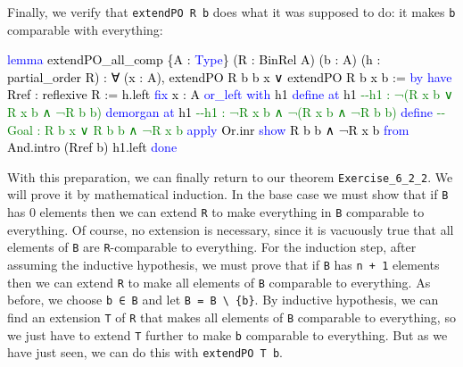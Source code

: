 \documentclass[
  letterpaper,
  DIV=11,
  numbers=noendperiod]{scrreprt}
\newenvironment{Shaded}{\begin{snugshade}}{\end{snugshade}}
\newcommand{\CommentTok}[1]{\textcolor[rgb]{0.37,0.37,0.37}{#1}}
\newcommand{\KeywordTok}[1]{\textcolor[rgb]{0.00,0.23,0.31}{#1}}
\newcommand{\NormalTok}[1]{\textcolor[rgb]{0.00,0.23,0.31}{#1}}
\renewcommand{\NormalTok}[1]{\textcolor[HTML]{000000}{#1}}
\renewcommand{\KeywordTok}[1]{\textcolor[HTML]{0000FF}{#1}}
\renewcommand{\CommentTok}[1]{\textcolor[HTML]{008000}{#1}}
\theoremstyle{remark}
\begin{document}
Finally, we verify that \texttt{extendPO\ R\ b} does what it was
supposed to do: it makes \texttt{b} comparable with everything:

\begin{Shaded}
\begin{Highlighting}[]
\KeywordTok{lemma}\NormalTok{ extendPO\_all\_comp \{A : }\KeywordTok{Type}\NormalTok{\} (R : BinRel A) (b : A)}
\NormalTok{    (h : partial\_order R) :}
\NormalTok{    ∀ (x : A), extendPO R b b x ∨ extendPO R b x b := }\KeywordTok{by}
  \KeywordTok{have}\NormalTok{ Rref : reflexive R := h.left}
  \KeywordTok{fix}\NormalTok{ x : A}
  \KeywordTok{or\_left} \KeywordTok{with}\NormalTok{ h1}
  \KeywordTok{define} \KeywordTok{at}\NormalTok{ h1     }\CommentTok{{-}{-}h1 : ¬(R x b ∨ R x b ∧ ¬R b b)}
  \KeywordTok{demorgan} \KeywordTok{at}\NormalTok{ h1   }\CommentTok{{-}{-}h1 : ¬R x b ∧ ¬(R x b ∧ ¬R b b)}
  \KeywordTok{define}           \CommentTok{{-}{-}Goal : R b x ∨ R b b ∧ ¬R x b}
  \KeywordTok{apply}\NormalTok{ Or.inr}
  \KeywordTok{show}\NormalTok{ R b b ∧ ¬R x b }\KeywordTok{from}\NormalTok{ And.intro (Rref b) h1.left}
  \KeywordTok{done}
\end{Highlighting}
\end{Shaded}

With this preparation, we can finally return to our theorem
\texttt{Exercise\_6\_2\_2}. We will prove it by mathematical induction.
In the base case we must show that if \texttt{B} has 0 elements then we
can extend \texttt{R} to make everything in \texttt{B} comparable to
everything. Of course, no extension is necessary, since it is vacuously
true that all elements of \texttt{B} are \texttt{R}-comparable to
everything. For the induction step, after assuming the inductive
hypothesis, we must prove that if \texttt{B} has \texttt{n\ +\ 1}
elements then we can extend \texttt{R} to make all elements of
\texttt{B} comparable to everything. As before, we choose
\texttt{b\ ∈\ B} and let
\texttt{B\textquotesingle{}\ =\ B\ \textbackslash{}\ \{b\}}. By
inductive hypothesis, we can find an extension
\texttt{T\textquotesingle{}} of \texttt{R} that makes all elements of
\texttt{B\textquotesingle{}} comparable to everything, so we just have
to extend \texttt{T\textquotesingle{}} further to make \texttt{b}
comparable to everything. But as we have just seen, we can do this with
\texttt{extendPO\ T\textquotesingle{}\ b}.
\end{document}
